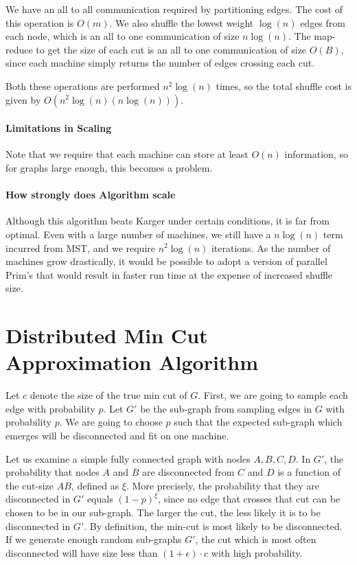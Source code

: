 \documentclass[12pt]{article}
\begin{document}
We have an all to all communication required by partitioning edges. The cost of this operation is $O(m)$. We also shuffle the lowest weight $\log(n)$ edges from each node, which is an all to one communication of size $n \log(n)$. The map-reduce to get the size of each cut is an all to one communication of size $O(B)$, since each machine simply returns the number of edges crossing each cut.

Both these operations are performed $n^2\log(n)$ times, so the total shuffle cost is given by $O(n^2\log(n) (n \log(n)))$. 

\paragraph{Limitations in Scaling}

Note that we require that each machine can store at least $O(n)$ information, so for graphs large enough, this becomes a problem.

\paragraph{How strongly does Algorithm scale} Although this algorithm beats Karger under certain conditions, it is far from optimal. Even with a large number of machines, we still have a $n\log(n)$ term incurred from MST, and we require $n^2 \log(n)$ iterations. As the number of machines grow drastically, it would be possible to adopt a version of parallel Prim's that would result in faster run time at the expense of increased shuffle size.

\section*{Distributed Min Cut Approximation Algorithm}

Let $c$ denote the size of the true min cut of $G$. First, we are going to sample each edge with probability $p$. Let $G'$ be the sub-graph from sampling edges in $G$ with probability $p$. We are going to choose $p$ such that the expected sub-graph which emerges will be disconnected and fit on one machine. 

Let us examine a simple fully connected graph with nodes $A, B, C, D$.  In $G'$, the probability that nodes $A$ and $B$ are disconnected from $C$ and $D$ is a function of the cut-size $AB$, defined as $\xi$. More precisely, the probability that they are disconnected in $G'$ equals $(1-p)^\xi$, since no edge that crosses that cut can be chosen to be in our sub-graph. The larger the cut, the less likely it is to be disconnected in $G'$. By definition, the min-cut is most likely to be disconnected. If we generate enough random sub-graphs $G'$, the cut which is most often disconnected will have size less than $(1+\epsilon) \cdot c$ with high probability.
\end{document}

